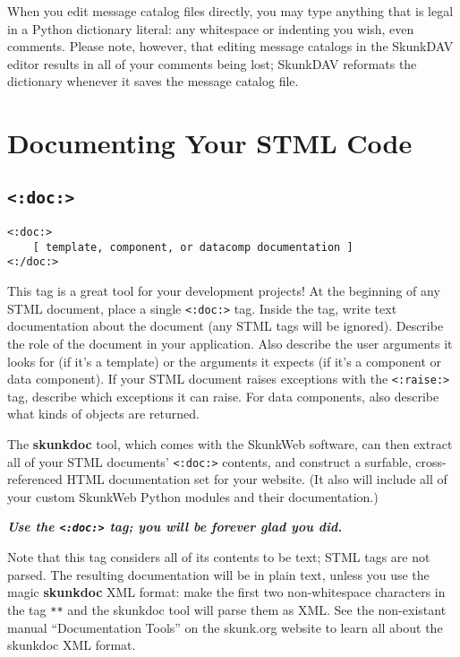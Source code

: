 \documentclass{manual}
\begin{document}
When you edit message catalog files directly,
you may type anything that is legal in a Python
dictionary literal: any whitespace or indenting you wish,
even comments. Please note, however, that editing
message catalogs in the SkunkDAV editor results in 
all of your comments being lost; SkunkDAV
reformats the dictionary whenever it saves the
message catalog file.

\chapter{Documenting Your STML Code}
\label{stmlrefmisc}



\section{\texttt{<:doc:>}}
\label{tagdoc}

\begin{verbatim}<:doc:>
    [ template, component, or datacomp documentation ]
<:/doc:>
\end{verbatim}


This tag is a great tool for your development projects!
At the beginning of any STML document,
place a single \texttt{<:doc:>} tag. Inside the tag,
write text documentation about the document (any STML tags will
be ignored). Describe the role of the document in your application.
Also describe the user arguments it looks for (if it's a template)
or the arguments it expects (if it's a component or data component).
If your STML document raises exceptions with the \texttt{<:raise:>}
tag, describe which exceptions it can raise.
For data components, also describe what kinds of objects are returned.

The \textbf{skunkdoc} tool, which comes with the SkunkWeb software, can
then extract all of your STML documents' \texttt{<:doc:>} 
contents, and construct a surfable, cross-referenced HTML
documentation set for your website. (It also will include all of
your custom SkunkWeb Python modules and their documentation.)

\textbf{\emph{Use the \texttt{<:doc:>}
tag; you will be forever glad you did.}}

Note that this tag considers all of its contents to be text; STML tags
are not parsed. The resulting documentation will be in plain text, unless
you use the magic \textbf{skunkdoc} XML format: make the first two
non-whitespace characters in the tag \texttt{**} and the skunkdoc tool
will parse them as XML. See the non-existant 
manual ``Documentation Tools'' on the skunk.org
website to learn all about the skunkdoc XML format.
\end{document}
